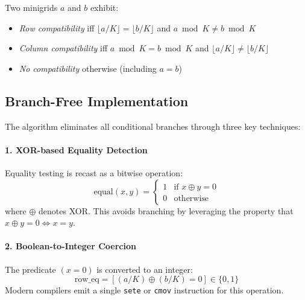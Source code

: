 \documentclass[11pt,a4paper]{article}
\begin{document}
Two minigrids $a$ and $b$ exhibit:
\begin{itemize}
    \item \emph{Row compatibility} iff $\lfloor a / K \rfloor = \lfloor b / K \rfloor$ and $a \bmod K \neq b \bmod K$
    \item \emph{Column compatibility} iff $a \bmod K = b \bmod K$ and $\lfloor a / K \rfloor \neq \lfloor b / K \rfloor$
    \item \emph{No compatibility} otherwise (including $a = b$)
\end{itemize}

\subsection{Branch-Free Implementation}

The algorithm eliminates all conditional branches through three key techniques:

\paragraph{1. XOR-based Equality Detection}
Equality testing is recast as a bitwise operation:
\begin{equation}
    \text{equal}(x, y) = \begin{cases}
        1 & \text{if } x \oplus y = 0 \\
        0 & \text{otherwise}
    \end{cases}
\end{equation}
where $\oplus$ denotes XOR. This avoids branching by leveraging the property that $x \oplus y = 0 \iff x = y$.

\paragraph{2. Boolean-to-Integer Coercion}
The predicate $(x = 0)$ is converted to an integer:
\begin{equation}
    \text{row\_eq} = [(a / K) \oplus (b / K) = 0] \in \{0, 1\}
\end{equation}
Modern compilers emit a single \texttt{sete} or \texttt{cmov} instruction for this operation.
\end{document}
